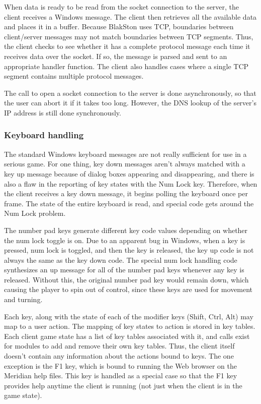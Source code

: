 When data is ready to be read from the socket connection to the
server, the client receives a Windows message.  The client then
retrieves all the available data and places it in a buffer.  Because
BlakSton uses TCP, boundaries between client/server messages may not
match boundaries between TCP segments.  Thus, the client checks to see
whether it has a complete protocol message each time it receives data
over the socket.  If so, the message is parsed and sent to an
appropriate handler function.  The client also handles cases where a
single TCP segment contains multiple protocol messages.

The call to open a socket connection to the server is done
asynchronously, so that the user can abort it if it takes too long.
However, the DNS lookup of the server's IP address is still done
synchronously.

\subsubsection{Keyboard handling}

The standard Windows keyboard messages are not really sufficient for
use in a serious game.  For one thing, key down messages aren't always
matched with a key up message because of dialog boxes appearing and
disappearing, and there is also a flaw in the reporting of key states
with the Num Lock key.  Therefore, when the client receives a key down
message, it begins polling the keyboard once per frame.  The state of
the entire keyboard is read, and special code gets around the Num Lock
problem.

The number pad keys generate different key code values depending on
whether the num lock toggle is on.  Due to an apparent bug in Windows,
when a key is pressed, num lock is toggled, and then the key is
released, the key up code is not always the same as the key down code.
The special num lock handling code synthesizes an up message for all
of the number pad keys whenever any key is released.  Without this,
the original number pad key would remain down, which causing the
player to spin out of control, since these keys are used for movement
and turning.

Each key, along with the state of each of the modifier keys (Shift,
Ctrl, Alt) may map to a user action.  The mapping of key states to
action is stored in key tables.  Each client game state has a list of key
tables associated with it, and calls exist for modules to add and
remove their own key tables.  Thus, the client itself doesn't contain
any information about the actions bound to keys.  The one exception is
the F1 key, which is bound to running the Web browser on the Meridian
help files.  This key is handled as a special case so that the F1 key
provides help anytime the client is running (not just when the client
is in the game state).

